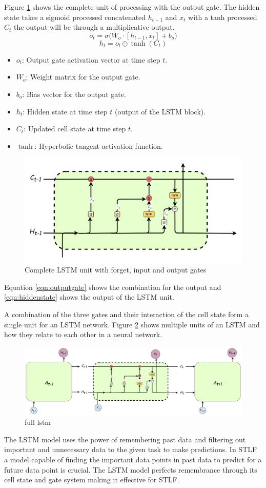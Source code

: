  Figure \ref{fig:forgetinputoutputgates1} shows the complete unit of processing with the output gate. The hidden state takes a sigmoid processed concatenated $h_{t-1}$ and $x_t$ with a tanh processed $C_t$ the output will be through a multiplicative output. 
 \[
 o_t = \sigma \Big( W_o \cdot [h_{t-1}, x_t] + b_o \Big)
\label{eqn:outputgate}
 \]
 \[
 h_t = o_t \odot \tanh(C_t)
 \label{eqn:hiddenstate}
 \]
 {\small 
 \begin{itemize}
 	\item $o_t$: Output gate activation vector at time step $t$.
 	\item $W_o$: Weight matrix for the output gate.
 	\item $b_o$: Bias vector for the output gate.
 	\item $h_t$: Hidden state at time step $t$ (output of the LSTM block).
 	\item $C_t$: Updated cell state at time step $t$.
 	\item $\tanh$: Hyperbolic tangent activation function.
 \end{itemize}
}
 \begin{figure}[h]
 	\centering
 	\includegraphics[width=0.5\linewidth]{Chapters/images/forget_input_output_gates1}
 	\caption{Complete LSTM unit with forget, input and output gates }
 	\label{fig:forgetinputoutputgates1}
 \end{figure}
  Equation \ref{eqn:outputgate}  shows the combination for the output and \ref{eqn:hiddenstate} shows the output of the LSTM unit.
  
  A combination of the three gates and their interaction of the cell state form a single unit for an LSTM network. Figure \ref{fig:full-lstm} shows multiple units of an LSTM and how they relate to each other in a neural network. 
 \begin{figure}[h]
 	\centering
 	\includegraphics[width=0.9\linewidth]{"Chapters/images/full lstm"}
 	\caption{full lstm}
 	\label{fig:full-lstm}
 \end{figure}
 The LSTM model uses the power of remembering past data and filtering out important and unnecessary data to the given task to make predictions. In STLF a model capable of finding the important data points in past data to predict for a future data point is crucial. The LSTM model perfects remembrance through its cell state and gate system making it effective for STLF.
 
